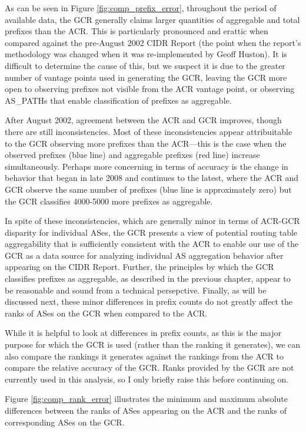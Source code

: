 As can be seen in Figure \ref{fig:comp_prefix_error}, throughout the period of
available data, the GCR generally claims larger quantities of aggregable and
total prefixes than the ACR. This is particularly pronounced and erattic when
compared against the pre-August 2002 CIDR Report (the point when the report's
methodology was changed when it was re-implemented by Geoff Huston). It is
difficult to determine the cause of this, but we suspect it is due to the
greater number of vantage points used in generating the GCR, leaving the GCR
more open to observing prefixes not visible from the ACR vantage point, or
observing AS\_PATHs that enable classification of prefixes as aggregable.

After August 2002, agreement between the ACR and GCR improves, though there are
still inconsistencies. Most of these inconsistencies appear attribuitable to
the GCR observing more prefixes than the ACR---this is the case when the
observed prefixes (blue line) and aggregable prefixes (red line) increase
simultaneously. Perhaps more concerning in terms of accuracy is the change in
behavior that began in late 2008 and continues to the latest, where the ACR and
GCR observe the same number of prefixes (blue line is approximately zero) but
the GCR classifies 4000-5000 more prefixes as aggregable.

In spite of these inconsistencies, which are generally minor in terms of
ACR-GCR disparity for individual ASes, the GCR presents a view of potential
routing table aggregability that is sufficiently consistent with the ACR to
enable our use of the GCR as a data source for analyzing individual AS
aggregation behavior after appearing on the CIDR Report. Further, the
principles by which the GCR classifies prefixes as aggregable, as described in
the previous chapter, appear to be reasonable and sound from a technical
persepctive. Finally, as will be discussed next, these minor differences in
prefix counts do not greatly affect the ranks of ASes on the GCR when compared
to the ACR.

While it is helpful to look at differences in prefix counts, as this is the
major purpose for which the GCR is used (rather than the ranking it generates),
we can also compare the rankings it generates against the rankings from the ACR
to compare the relative accuracy of the GCR. Ranks provided by the GCR are not
currently used in this analysis, so I only briefly raise this before continuing
on.

Figure \ref{fig:comp_rank_error} illustrates the minimum and maximum absolute
differences between the ranks of ASes appearing on the ACR and the ranks of
corresponding ASes on the GCR.

